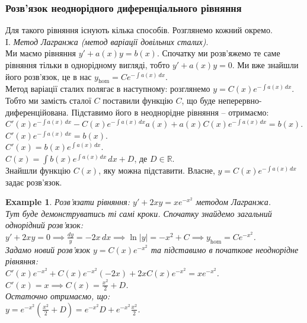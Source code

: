 \documentclass[a4paper, 10pt]{article}
\theoremstyle{theoremdd}
\theoremstyle{theoremdd}
\theoremstyle{theoremdd}
\theoremstyle{theoremdd}
\newtheorem{example}[theorem]{Example}
\theoremstyle{theoremdd}
\theoremstyle{theoremdd}
\theoremstyle{theoremdd}
\theoremstyle{theoremdd}
\begin{document}
	\subsubsection*{Розв'язок неоднорідного диференціального рівняння}
	Для такого рівняння існують кілька способів. Розглянемо кожний окремо.\\
	I. \textit{Метод Лагранжа (метод варіації довільних сталих)}.\\
	Ми маємо рівняння $y' + a(x) y = b(x)$. Спочатку ми розв'яжемо те саме рівняння тільки в однорідному вигляді, тобто $y' + a(x) y = 0$. Ми вже знайшли його розв'язок, це в нас $y_{\text{hom}} = C e^{-\int a(x)\,dx}$.\\
	Метод варіації сталих полягає в наступному: розглянемо $y = \displaystyle C(x) e^{-\int a(x)\,dx}$. Тобто ми замість сталої $C$ поставили функцію $C$, що буде неперервно-диференційована. Підставимо його в неоднорідне рівняння -- отримаємо:\\
	$\displaystyle C'(x) e^{-\int a(x)\,dx} - C(x) e^{-\int a(x)\,dx} a(x) + a(x) C(x) e^{-\int a(x)\,dx} = b(x)$.\\
	$C'(x) e^{-\int a(x)\,dx} = b(x)$.\\
	$C'(x) = b(x) e^{\int a(x)\,dx}$.\\
	$C(x) = \displaystyle\int b(x) e^{\int a(x)\,dx}\,dx + D$, де $D \in \mathbb{R}$.\\
	Знайшли функцію $C(x)$, яку можна підставити. Власне, $y = C(x) e^{-\int a(x)\,dx}$ задає розв'язок.
	
	\begin{example}
	 Розв'язати рівняння: $\displaystyle y' + 2xy = xe^{-x^2}$ методом Лагранжа.\\
	 Тут буде демонструватись ті самі кроки. Спочатку знайдемо загальний однорідний розв'язок:\\
	$y'+2xy=0 \implies \displaystyle \frac{dy}{y} = -2x \,dx \implies \ln |y| = -x^2 + C \implies y_{\text{hom}} = Ce^{-x^2}$.\\
	Задамо новий розв'язок $y = C(x)e^{-x^2}$ та підставимо в початкове неоднорідне рівняння:\\
	$C'(x)e^{-x^2} + C(x)e^{-x^2}(-2x) + 2xC(x)e^{-x^2} = xe^{-x^2}$.\\
	$C'(x) = x \implies \displaystyle C(x) = \frac{x^2}{2} + D$.\\
	Остаточно отримаємо, що:\\
	$\displaystyle y = e^{-x^2} \left(\frac{x^2}{2} + D \right) = e^{-x^2}D + e^{-x^2} \frac{x^2}{2}$.
	\end{example}
	
\end{document}
